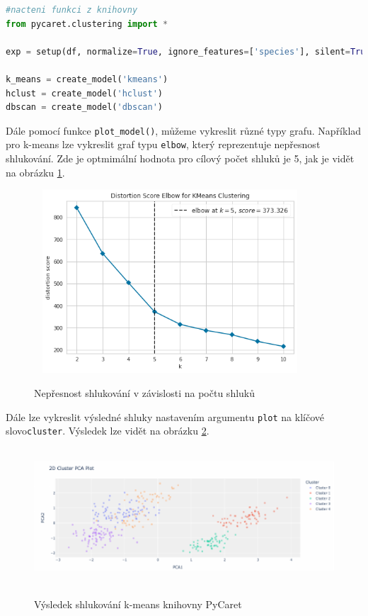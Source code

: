 \begin{mdframed}
\begin{lstlisting}[language=Python]
#nacteni funkci z knihovny
from pycaret.clustering import *

exp = setup(df, normalize=True, ignore_features=['species'], silent=True)

k_means = create_model('kmeans')
hclust = create_model('hclust')
dbscan = create_model('dbscan')
\end{lstlisting}   
\end{mdframed}

Dále pomocí funkce \verb|plot_model()|, můžeme vykreslit různé typy grafu. Například pro k-means lze vykreslit graf typu \verb|elbow|, který reprezentuje nepřesnost shlukování. Zde je optmimální hodnota pro cílový počet shluků je 5, jak je vidět na obrázku \ref{kmeanspycaret}. 

\begin{figure}[h]\centering
  \centering
  \includegraphics[width=4in,height=2.7in]{obrazky/pycaretkmeans.png}\\[1pt]
  \caption{Nepřesnost shlukování v závislosti na počtu shluků}
  \label{kmeanspycaret}
\end{figure}

Dále lze vykreslit výsledné shluky nastavením argumentu \verb|plot| na klíčové slovo\verb|cluster|. Výsledek lze vidět na obrázku \ref{kmeanspycaretclusters}.

\begin{figure}[h]\centering
  \centering
  \includegraphics[width=\linewidth,height=2.0in]{obrazky/clusterspycaret.pdf}\\[1pt]
  \caption{Výsledek shlukování k-means knihovny PyCaret}
  \label{kmeanspycaretclusters}
\end{figure}

